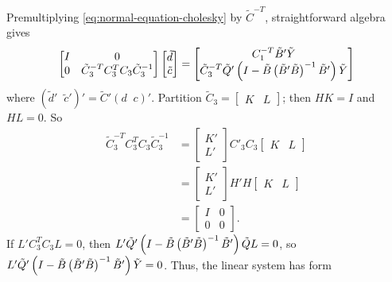 Premultiplying \ref{eq:normal-equation-cholesky} by $\tilde{C}^{-T}$, straightforward algebra gives 
\begin{equation} \label{eq:vectorized-normal-equations-cholesky}
\begin{bmatrix}
I & 0 \\
0 & \tilde{C}_3^{-T} C_3^{T} C_3 \tilde{C}_3^{-1}\\
\end{bmatrix}
\begin{bmatrix}
\tilde{d}\\
\tilde{c}\\
\end{bmatrix}
= \begin{bmatrix}
C_1^{-T} \tilde{B}'\tilde{Y} \\
\tilde{C}_3^{-T} \tilde{Q}'\left( I - \tilde{B}\left( \tilde{B}' \tilde{B} \right)^{-1} \tilde{B}' \right) \tilde{Y}\\
\end{bmatrix}
\end{equation}
\noindent
where $\left( \tilde{d}'\;\;\tilde{c}' \right)' =  \tilde{C}' \left( d\;\;c \right)'$. Partition $\tilde{C}_3 = \begin{bmatrix} K &  L\end{bmatrix}$; then $HK = I$ and $HL = 0$. So
\begin{align*}
\tilde{C}_3^{-T} C_3^{T} C_3 \tilde{C}_3^{-1} &= \begin{bmatrix} K' \\ L' \end{bmatrix} C'_3C_3 \begin{bmatrix} K &  L\end{bmatrix} \\
&= \begin{bmatrix} K' \\ L' \end{bmatrix} H'H \begin{bmatrix} K &  L\end{bmatrix} \\
&= \begin{bmatrix} I & 0 \\ 0 & 0 \end{bmatrix}.
\end{align*}
\noindent
If $L'C_3^{T} C_3 L = 0$, then $L'\tilde{Q}'\left( I - \tilde{B}\left( \tilde{B}' \tilde{B} \right)^{-1} \tilde{B}' \right)\tilde{Q} L = 0$, so $L'\tilde{Q}'\left( I - \tilde{B}\left( \tilde{B}' \tilde{B} \right)^{-1} \tilde{B}' \right) \tilde{Y} = 0$. Thus, the linear system has form
